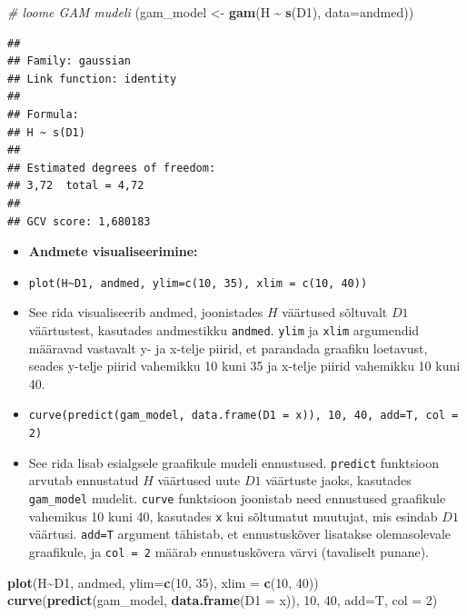 \documentclass[
]{book}
\newenvironment{Shaded}{\begin{snugshade}}{\end{snugshade}}
\newcommand{\AttributeTok}[1]{\textcolor[rgb]{0.13,0.29,0.53}{#1}}
\newcommand{\CommentTok}[1]{\textcolor[rgb]{0.56,0.35,0.01}{\textit{#1}}}
\newcommand{\DecValTok}[1]{\textcolor[rgb]{0.00,0.00,0.81}{#1}}
\newcommand{\FunctionTok}[1]{\textcolor[rgb]{0.13,0.29,0.53}{\textbf{#1}}}
\newcommand{\NormalTok}[1]{#1}
\newcommand{\OtherTok}[1]{\textcolor[rgb]{0.56,0.35,0.01}{#1}}
\newcommand{\SpecialCharTok}[1]{\textcolor[rgb]{0.81,0.36,0.00}{\textbf{#1}}}
\providecommand{\tightlist}{%
  \setlength{\itemsep}{0pt}\setlength{\parskip}{0pt}}
\renewenvironment{Shaded} {\begin{snugshade}\footnotesize} {\end{snugshade}}
\begin{document}
\begin{Shaded}
\begin{Highlighting}[]
\CommentTok{\# loome GAM mudeli}
\NormalTok{(gam\_model }\OtherTok{\textless{}{-}} \FunctionTok{gam}\NormalTok{(H }\SpecialCharTok{\textasciitilde{}} \FunctionTok{s}\NormalTok{(D1), }\AttributeTok{data=}\NormalTok{andmed))}
\end{Highlighting}
\end{Shaded}

\begin{verbatim}
## 
## Family: gaussian 
## Link function: identity 
## 
## Formula:
## H ~ s(D1)
## 
## Estimated degrees of freedom:
## 3,72  total = 4,72 
## 
## GCV score: 1,680183
\end{verbatim}

\begin{itemize}
\tightlist
\item
  \textbf{Andmete visualiseerimine:}
\item
  \texttt{plot(H\textasciitilde{}D1,\ andmed,\ ylim=c(10,\ 35),\ xlim\ =\ c(10,\ 40))}
\item
  See rida visualiseerib andmed, joonistades \(H\) väärtused sõltuvalt \(D1\) väärtustest, kasutades andmestikku \texttt{andmed}. \texttt{ylim} ja \texttt{xlim} argumendid määravad vastavalt y- ja x-telje piirid, et parandada graafiku loetavust, seades y-telje piirid vahemikku 10 kuni 35 ja x-telje piirid vahemikku 10 kuni 40.
\item
  \texttt{curve(predict(gam\_model,\ data.frame(D1\ =\ x)),\ 10,\ 40,\ add=T,\ col\ =\ 2)}
\item
  See rida lisab esialgsele graafikule mudeli ennustused. \texttt{predict} funktsioon arvutab ennustatud \(H\) väärtused uute \(D1\) väärtuste jaoks, kasutades \texttt{gam\_model} mudelit. \texttt{curve} funktsioon joonistab need ennustused graafikule vahemikus 10 kuni 40, kasutades \texttt{x} kui sõltumatut muutujat, mis esindab \(D1\) väärtusi. \texttt{add=T} argument tähistab, et ennustuskõver lisatakse olemasolevale graafikule, ja \texttt{col\ =\ 2} määrab ennustuskõvera värvi (tavaliselt punane).
\end{itemize}

\begin{Shaded}
\begin{Highlighting}[]
\FunctionTok{plot}\NormalTok{(H}\SpecialCharTok{\textasciitilde{}}\NormalTok{D1, andmed, }\AttributeTok{ylim=}\FunctionTok{c}\NormalTok{(}\DecValTok{10}\NormalTok{, }\DecValTok{35}\NormalTok{), }\AttributeTok{xlim =} \FunctionTok{c}\NormalTok{(}\DecValTok{10}\NormalTok{, }\DecValTok{40}\NormalTok{))}
\FunctionTok{curve}\NormalTok{(}\FunctionTok{predict}\NormalTok{(gam\_model, }\FunctionTok{data.frame}\NormalTok{(}\AttributeTok{D1 =}\NormalTok{ x)), }\DecValTok{10}\NormalTok{, }\DecValTok{40}\NormalTok{, }\AttributeTok{add=}\NormalTok{T, }\AttributeTok{col =} \DecValTok{2}\NormalTok{)}
\end{Highlighting}
\end{Shaded}
\end{document}
